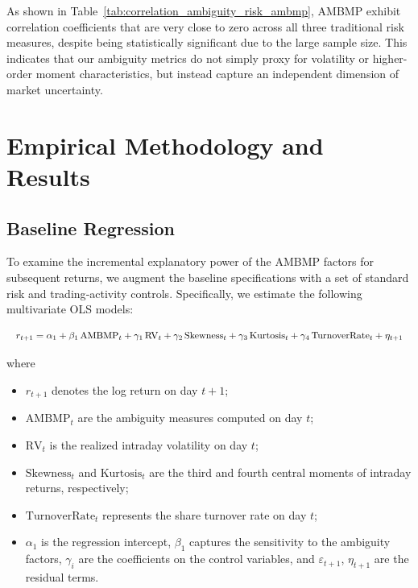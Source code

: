 \documentclass[preprint,12pt,authoryear]{elsarticle}
\begin{document}
As shown in Table~\ref{tab:correlation_ambiguity_risk_ambmp}, AMBMP exhibit correlation coefficients that are very close to zero across all three traditional risk measures, despite being statistically significant due to the large sample size. This indicates that our ambiguity metrics do not simply proxy for volatility or higher-order moment characteristics, but instead capture an independent dimension of market uncertainty.

\section{Empirical Methodology and Results}

\subsection{Baseline Regression}

To examine the incremental explanatory power of the AMBMP factors for subsequent returns, we augment the baseline specifications with a set of standard risk and trading‐activity controls. Specifically, we estimate the following multivariate OLS models:

\begin{equation}
\resizebox{\linewidth}{!}{$
  r_{t+1} = \alpha_1 + \beta_1\,\mathrm{AMBMP}_t
            + \gamma_{1}\,\mathrm{RV}_t
            + \gamma_{2}\,\mathrm{Skewness}_t
            + \gamma_{3}\,\mathrm{Kurtosis}_t
            + \gamma_{4}\,\mathrm{TurnoverRate}_t
            + \eta_{t+1}
$}
\end{equation}

where
\begin{itemize}
  \item \(r_{t+1}\) denotes the log return on day \(t+1\);
  \item \(\mathrm{AMBMP}_t\) are the ambiguity measures computed on day \(t\);
  \item \(\mathrm{RV}_t\) is the realized intraday volatility on day \(t\);
  \item \(\mathrm{Skewness}_t\) and \(\mathrm{Kurtosis}_t\) are the third and fourth central moments of intraday returns, respectively;
  \item \(\mathrm{TurnoverRate}_t\) represents the share turnover rate on day \(t\);
  \item \(\alpha_1\) is the regression intercept, \(\beta_1\) captures the sensitivity to the ambiguity factors, \(\gamma_i\) are the coefficients on the control variables, and \(\varepsilon_{t+1}\), \(\eta_{t+1}\) are the residual terms.
\end{itemize}
\end{document}
